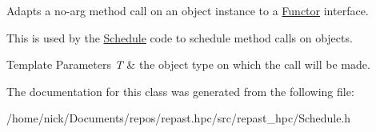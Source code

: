 Adapts a no-\/arg method call on an object instance to a \hyperlink{classrepast_1_1_functor}{Functor} interface. 

This is used by the \hyperlink{classrepast_1_1_schedule}{Schedule} code to schedule method calls on objects.


\begin{DoxyTemplParams}{Template Parameters}
{\em T} & the object type on which the call will be made. \\
\hline
\end{DoxyTemplParams}


The documentation for this class was generated from the following file\-:\begin{DoxyCompactItemize}
\item 
/home/nick/\-Documents/repos/repast.\-hpc/src/repast\-\_\-hpc/Schedule.\-h\end{DoxyCompactItemize}
